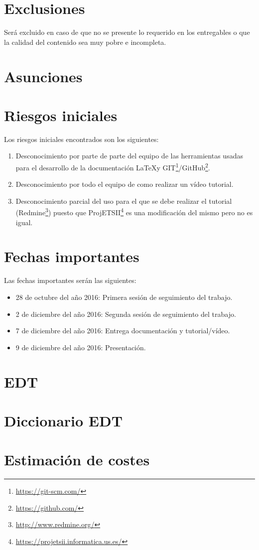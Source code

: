 \documentclass[a4paper,10pt]{scrartcl}
\begin{document}
\section{Exclusiones}
Será excluido en caso de que no se presente lo requerido en los entregables o que la calidad del contenido sea muy pobre e incompleta.


\section{Asunciones}

\section{Riesgos iniciales}

Los riesgos iniciales encontrados son los siguientes:
\begin{enumerate}
	\item Desconocimiento por parte de parte del equipo de las herramientas usadas para el desarrollo de la documentación \LaTeX y GIT\footnote{\url{https://git-scm.com/}}/GitHub\footnote{\url{https://github.com/}}.
	
	\item Desconocimiento por todo el equipo de como realizar un vídeo tutorial.
	
	\item Desconocimiento parcial del uso para el que se debe realizar el tutorial (Redmine\footnote{\url{http://www.redmine.org/}}) puesto que ProjETSII\footnote{\url{https://projetsii.informatica.us.es/}} es una modificación del mismo pero no es igual.
\end{enumerate}


\section{Fechas importantes}
Las fechas importantes serán las siguientes:

	\begin{itemize}
		\item 28 de octubre del año 2016: Primera sesión de seguimiento del trabajo.
		
		\item 2 de diciembre del año 2016: Segunda sesión de seguimiento del trabajo.
		
		\item 7 de diciembre del año 2016: Entrega documentación y tutorial/vídeo.
		
		\item 9 de diciembre del año 2016: Presentación.
	\end{itemize}

\section{EDT}

\section{Diccionario EDT}

\section{Estimación de costes}



\end{document}
